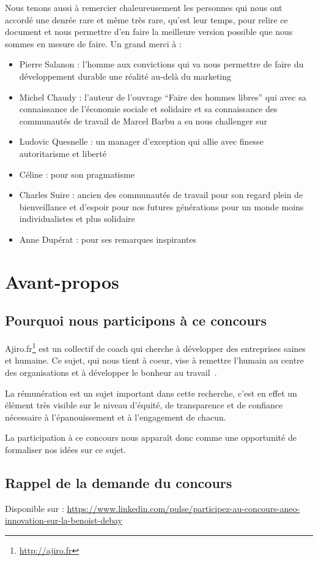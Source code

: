 \documentclass[12pt]{article}
\begin{document}
Nous tenons aussi à remercier chaleureusement les personnes qui nous ont accordé une denrée rare et même très rare, qu’est leur temps, pour relire ce document et nous permettre d’en faire la meilleure version possible que nous sommes en mesure de faire. Un grand merci à :
\begin{itemize}
  \item Pierre Salanon : l’homme aux convictions qui va nous permettre de faire du développement durable une réalité au-delà du marketing
  \item Michel Chaudy : l’auteur de l’ouvrage “Faire des hommes libres” qui avec sa connaissance de l’économie sociale et solidaire et sa connaissance des communautés de travail de Marcel Barbu a su nous challenger sur 
  \item Ludovic Quesnelle : un manager d’exception qui allie avec finesse autoritarisme et liberté
  \item Céline : pour son pragmatisme
  \item Charles Suire : ancien des communautés de travail pour son regard plein de bienveillance et d’espoir pour nos futures générations pour un monde moins individualistes et plus solidaire
  \item Anne Dupérat : pour ses remarques inspirantes
\end{itemize}


\section{Avant-propos}
\subsection{Pourquoi nous participons à ce concours}
 Ajiro.fr\footnote{\url{http://ajiro.fr}} est un collectif de coach qui cherche à développer des entreprises saines et humaine. Ce sujet, qui nous tient à coeur, vise à remettre l’humain au centre des organisations et à développer le bonheur au travail~\cite{Getz, Laloux}.

 La rémunération est un sujet important dans cette recherche, c’est en effet un élément très visible sur le niveau d’équité, de transparence et de confiance nécessaire à l'épanouissement et à l’engagement de chacun.

 La participation à ce concours nous apparaît donc comme une opportunité de formaliser nos idées sur ce sujet.

\subsection{Rappel de la demande du concours}
 Disponible sur : \url{https://www.linkedin.com/pulse/participez-au-concours-aneo-innovation-sur-la-benoist-debay}
\end{document}
